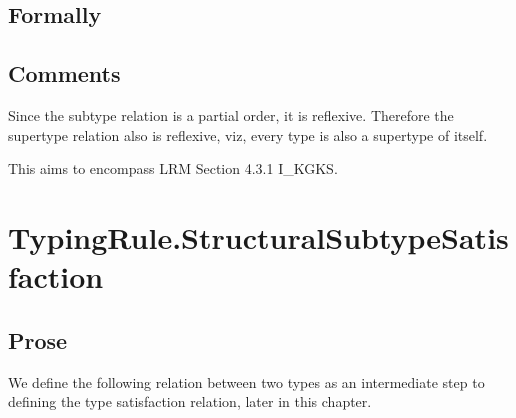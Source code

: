 \documentclass{book}
\begin{document}
\begin{emptyformal}
  \subsection{Formally}
\end{emptyformal}

\subsection{Comments}
  Since the subtype relation is a partial order, it is reflexive. Therefore the
  supertype relation also is reflexive, viz, every type is also a supertype of
  itself.

  This aims to encompass LRM Section 4.3.1 I\_KGKS.

\section{TypingRule.StructuralSubtypeSatisfaction}

\subsection{Prose}
We define the following relation between two types as an intermediate step to defining the type satisfaction relation, later in this chapter.
\end{document}
